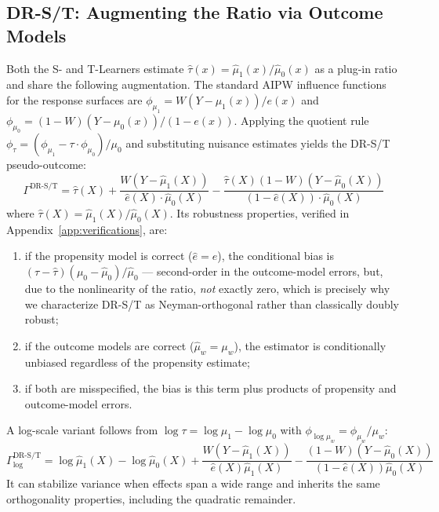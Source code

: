 \documentclass{article}
\begin{document}
\subsection{DR-S/T: Augmenting the Ratio via Outcome Models}

\label{sec:dr-t}
Both the S- and T-Learners estimate $\hat{\tau}(x) = \hat{\mu}_1(x)/\hat{\mu}_0(x)$ as a plug-in ratio and share the following augmentation. The
standard AIPW influence functions for the response surfaces are
$\phi_{\mu_1} = W(Y - \mu_1(x))/e(x)$ and
$\phi_{\mu_0} = (1-W)(Y - \mu_0(x))/(1-e(x))$. Applying the quotient
rule $\phi_{\tau} = (\phi_{\mu_1} - \tau \cdot \phi_{\mu_0})/\mu_0$ and
substituting nuisance estimates yields the DR-S/T pseudo-outcome:
\begin{equation}
\label{eq:dr-t}
\Gamma^{\text{DR-S/T}} = \hat{\tau}(X)
  + \frac{W(Y - \hat{\mu}_1(X))}{\hat{e}(X) \cdot \hat{\mu}_0(X)}
  - \frac{\hat{\tau}(X)(1-W)(Y - \hat{\mu}_0(X))}{(1-\hat{e}(X)) \cdot \hat{\mu}_0(X)}
\end{equation}
where $\hat{\tau}(X) = \hat{\mu}_1(X)/\hat{\mu}_0(X)$. Its robustness
properties, verified in Appendix~\ref{app:verifications}, are:
\begin{enumerate}
    \item[(a)] if the propensity model is correct
    ($\hat{e} = e$), the conditional bias is
    $(\tau - \hat{\tau})(\mu_0 - \hat{\mu}_0)/\hat{\mu}_0$ --- second-order
    in the outcome-model errors, but, due to the nonlinearity of the
    ratio, \emph{not} exactly zero, which is precisely why we
    characterize DR-S/T as Neyman-orthogonal rather than classically
    doubly robust;
    \item[(b)] if the outcome models are correct
    ($\hat{\mu}_w = \mu_w$), the estimator is conditionally unbiased
    regardless of the propensity estimate;
    \item[(c)] if both are misspecified, the bias is this term plus
    products of propensity and outcome-model errors.
\end{enumerate}
A log-scale variant follows from
$\log \tau = \log \mu_1 - \log \mu_0$ with
$\phi_{\log \mu_w} = \phi_{\mu_w}/\mu_w$:
\begin{equation}
\label{eq:dr-t-log}
\Gamma^{\text{DR-S/T}}_{\log} = \log \hat{\mu}_1(X) - \log \hat{\mu}_0(X)
  + \frac{W(Y - \hat{\mu}_1(X))}{\hat{e}(X) \hat{\mu}_1(X)}
  - \frac{(1-W)(Y - \hat{\mu}_0(X))}{(1-\hat{e}(X)) \hat{\mu}_0(X)}
\end{equation}
It can stabilize variance when effects span a wide range and inherits
the same orthogonality properties, including the quadratic remainder.
\end{document}
